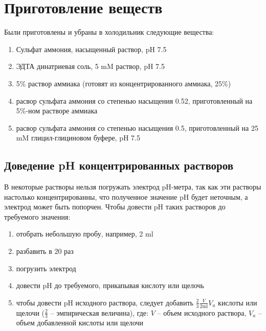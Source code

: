 
\section{Приготовление веществ}

Были приготовлены и убраны в холодильник следующие вещества:
\begin{enumerate}
\item Сульфат аммония, насыщенный раствор, pH 7.5
\item ЭДТА динатриевая соль, 5 mM раствор, pH 7.5
\item 5\% раствор аммиака (готовят из концентрированного аммиака, 25\%)
\item расвор сульфата аммония со степенью насыщения 0.52,
    приготовленный на 5\%-ном растворе аммиака
\item расвор сульфата аммония со степенью насыщения 0.5,
    приготовленный на 25 mM глицил-глициновом буфере, pH 7.5
\end{enumerate}

\subsection{Доведение pH концентрированных растворов}
\label{set-pH}
В некоторые растворы нельзя погружать электрод pH-метра,
так как эти растворы настолько концентрированны, что полученное значение pH будет неточным,
а электрод может быть попорчен.
Чтобы довести pH таких растворов до требуемого значения:
\begin{enumerate}
\item отобрать небольшую пробу, например, 2 ml
\item разбавить в 20 раз
\item погрузить электрод
\item довести pH до требуемого, прикапывая кислоту или щелочь
\item чтобы довести pH исходного раствора, следует добавить
     $ \frac{2}{3} \frac{V}{2\text{ml}} V_a$ кислоты или щелочи
     ($\frac{2}{3}$ -- эмпирическая величина), где:
     $ V $ -- объем исходного раствора,
     $ V_a $ -- объем добавленной кислоты или щелочи
\end{enumerate}

